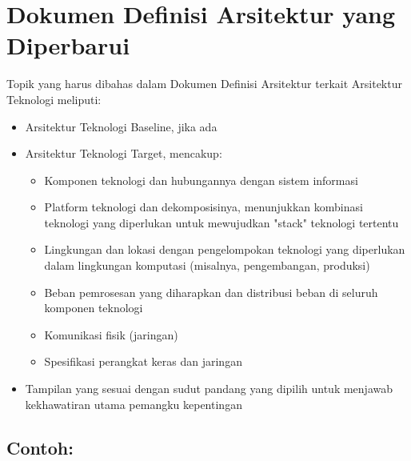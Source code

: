\section{Dokumen Definisi Arsitektur yang Diperbarui}
Topik yang harus dibahas dalam Dokumen Definisi Arsitektur terkait Arsitektur Teknologi meliputi:
\begin{itemize}
	\item Arsitektur Teknologi Baseline, jika ada 
	\item Arsitektur Teknologi Target, mencakup:
	\begin{itemize}
		\item Komponen teknologi dan hubungannya dengan sistem informasi
		\item Platform teknologi dan dekomposisinya, menunjukkan kombinasi teknologi yang diperlukan untuk mewujudkan "stack" teknologi tertentu
		\item Lingkungan dan lokasi dengan pengelompokan teknologi yang diperlukan dalam lingkungan komputasi (misalnya, pengembangan, produksi)
		\item Beban pemrosesan yang diharapkan dan distribusi beban di seluruh komponen teknologi
		\item Komunikasi fisik (jaringan)
		\item Spesifikasi perangkat keras dan jaringan
	\end{itemize}
	\item Tampilan yang sesuai dengan sudut pandang yang dipilih untuk menjawab kekhawatiran utama pemangku kepentingan
\end{itemize}

\subsection*{Contoh:}

